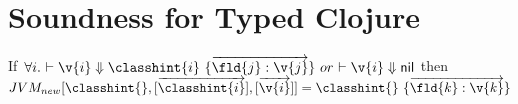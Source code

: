 \section{Soundness for Typed Clojure}

\begin{assumption}[\newjavaliteral] \label{assumption:new}
  If\ $\forall i.\ {\opsem{}{\v{i}}{\classvalue{\classhint{i}}{\overrightarrow{\classfieldpair{\fld{j}} {\v{j}}}}}}\ or\ {\opsem{}{\v{i}}{\nil}}$
                  then
         $\newjava {\classhint{}}
                  {\overrightarrow{\classhint{i}}}
                  {\overrightarrow{\v{i}}}
                  {\classvalue{\classhint{}}{\overrightarrow {\classfieldpair{\fld{k}} {\v{k}}}}}$

\end{assumption}

